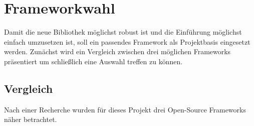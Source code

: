 \section{Frameworkwahl}
Damit die neue Bibliothek möglichst robust ist und die Einführung möglichst einfach umzusetzen ist, soll ein passendes Framework als Projektbasis eingesetzt werden. Zunächst wird ein Vergleich zwischen drei möglichen Frameworks präsentiert um schließlich eine Auswahl treffen zu können.

\subsection{Vergleich}
\label{sec:frameworkComparision}
Nach einer Recherche wurden für dieses Projekt drei Open-Source Frameworks näher betrachtet.


